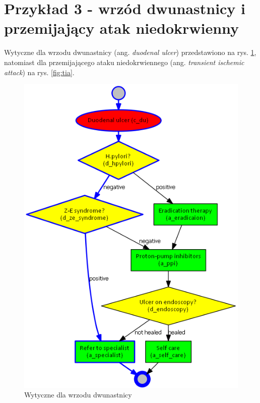 \section{Przykład 3 - wrzód dwunastnicy i przemijający atak niedokrwienny}
Wytyczne dla wrzodu dwunastnicy (ang. \textit{duodenal ulcer}) przedstawiono na rys. \ref{fig:du}, natomiast dla przemijającego ataku niedokrwiennego (ang. \textit{transient ischemic attack}) na rys. \ref{fig:tia}.
\begin{figure}[H]
\centering
\includegraphics[scale=0.45]{img/du.png}
\caption{Wytyczne dla wrzodu dwunastnicy}
\label{fig:du}
\end{figure}


